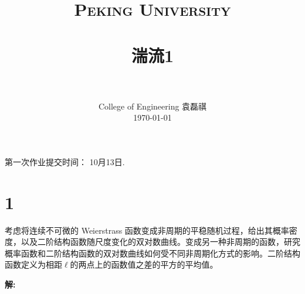 \documentclass[12pt]{ctexart}
\title{
	\vspace{-1in} 	
	\usefont{OT1}{bch}{b}{n}
	\normalfont \normalsize \textsc{\LARGE Peking University}\\[1cm] %
	\horrule{0.5pt} \\[0.5cm]
	\huge \bfseries{湍流1} \\
	\horrule{2pt} \\[0.5cm]
}
\author{
	\normalfont 								\normalsize
	College of Engineering \quad 2001111690  \quad 袁磊祺\\	\normalsize
	\today
}
\date{}
\begin{document}


\maketitle

第一次作业提交时间： 10月13日.

\section{1}

考虑将连续不可微的 Weierstrass 函数变成非周期的平稳随机过程，给出其概率密度，以及二阶结构函数随尺度变化的双对数曲线。变成另一种非周期的函数，研究概率函数和二阶结构函数的双对数曲线如何受不同非周期化方式的影响。二阶结构函数定义为相距$\ell$的两点上的函数值之差的平方的平均值。

\textsf{\hspace{-2em}\sf  \textbf{解:}}
\end{document}
